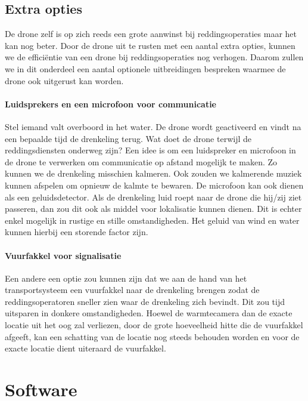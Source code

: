 \subsection{Extra opties}

De drone zelf is op zich reeds een grote aanwinst bij reddingsoperaties maar het kan nog beter. Door de drone uit te rusten met een aantal extra opties, kunnen we de efficiëntie van een drone bij reddingsoperaties nog verhogen. Daarom zullen we in dit onderdeel een aantal optionele uitbreidingen bespreken waarmee de drone ook uitgerust kan worden.  

\paragraph{Luidsprekers en een microfoon voor communicatie}

Stel iemand valt overboord in het water. De drone wordt geactiveerd en vindt na een bepaalde tijd de drenkeling terug. Wat doet de drone terwijl de reddingsdiensten onderweg zijn? Een idee is om een luidspreker en microfoon in de drone te verwerken om communicatie op afstand mogelijk te maken. Zo kunnen we de drenkeling misschien kalmeren. Ook zouden we kalmerende muziek kunnen afspelen om opnieuw de kalmte te bewaren. 
De microfoon kan ook dienen als een geluidsdetector. Als de drenkeling luid roept naar de drone die hij/zij ziet passeren, dan zou dit ook als middel voor lokalisatie kunnen dienen. Dit is echter enkel mogelijk in rustige en stille omstandigheden. Het geluid van wind en water kunnen hierbij een storende factor zijn. 

\paragraph{Vuurfakkel voor signalisatie}

Een andere een optie zou kunnen zijn dat we aan de hand van het transportsysteem een vuurfakkel naar de drenkeling brengen zodat de reddingsoperatoren sneller zien waar de drenkeling zich bevindt. Dit zou tijd uitsparen in donkere omstandigheden. Hoewel de warmtecamera dan de exacte locatie uit het oog zal verliezen, door de grote hoeveelheid hitte die de vuurfakkel afgeeft, kan een schatting van de locatie nog steeds behouden worden en voor de exacte locatie dient uiteraard de vuurfakkel. 

\section{Software}

